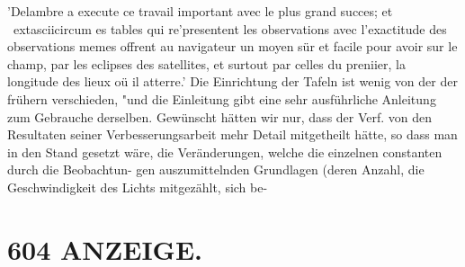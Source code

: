 \documentclass[12pt,a4paper]{article}
\begin{document}
{{{{{{{'Delambre  a  execute  ce  travail  important  avec  le  plus  grand  succes;  et  \	extasciicircum{}{ }es  tables  qui  re'presentent  les observations  avec  l'exactitude  des  observations  memes  offrent  au  navigateur  un  moyen  sür  et  facile  pour avoir  sur  le  champ,  par  les  eclipses  des  satellites,  et  surtout  par  celles  du  preniier,  la  longitude  des lieux  oü  il  atterre.'  Die  Einrichtung  der  Tafeln  ist  wenig  von  der  der  frühern  verschieden,  "und  die Einleitung  gibt  eine  sehr  ausführliche  Anleitung  zum  Gebrauche  derselben.  Gewünscht  hätten  wir  nur, dass  der  Verf.  von  den  Resultaten  seiner  Verbesserungsarbeit  mehr  Detail  mitgetheilt  hätte,  so  dass  man in  den  Stand  gesetzt  wäre,  die  Veränderungen,  welche  die  einzelnen  constanten  durch  die  Beobachtun- gen auszumittelnden  Grundlagen  (deren  Anzahl,    die    Geschwindigkeit   des   Lichts   mitgezählt,    sich  be-


\section*{604  ANZEIGE.}

}}}}}}}
\end{document}
